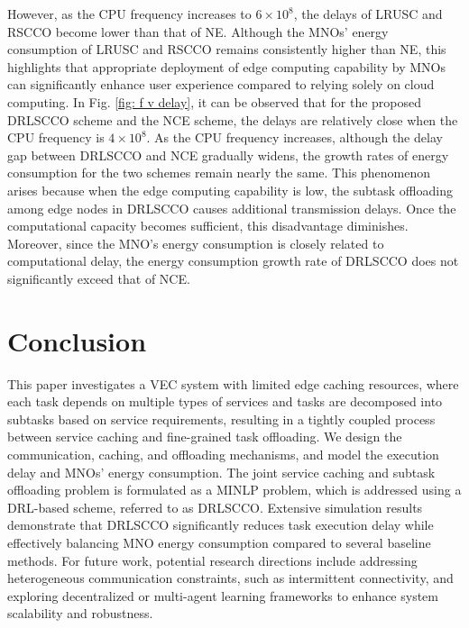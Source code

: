 \documentclass[lettersize,journal]{IEEEtran}
\begin{document}
However, as the CPU frequency increases to $6 \times 10^8$, the delays of LRUSC and RSCCO become lower than that of NE. Although the MNOs' energy consumption of LRUSC and RSCCO remains consistently higher than NE, this highlights that appropriate deployment of edge  computing capability by MNOs can significantly enhance user experience compared to relying solely on cloud computing.
In Fig. \ref{fig: f v delay}, it can be observed that for the proposed DRLSCCO scheme and the NCE scheme, the delays are relatively close when the CPU frequency is $4 \times 10^8$. As the CPU frequency increases, although the delay gap between DRLSCCO and NCE gradually widens, the growth rates of energy consumption for the two schemes remain nearly the same.
This phenomenon arises because when the edge computing capability is low, the subtask offloading among edge nodes in DRLSCCO causes additional transmission delays. Once the computational capacity becomes sufficient, this disadvantage diminishes. Moreover, since the MNO's energy consumption is closely related to computational delay, the energy consumption growth rate of DRLSCCO does not significantly exceed that of NCE.



\section{Conclusion}
This paper investigates a VEC system with limited edge caching resources, where each task depends on multiple types of services and tasks are decomposed into subtasks based on service requirements, resulting in a tightly coupled process between service caching and fine-grained task offloading.
We design the communication, caching, and offloading mechanisms, and model the execution delay and MNOs' energy consumption.
The joint service caching and subtask offloading problem is formulated as a MINLP problem, which is addressed using a DRL-based scheme, referred to as DRLSCCO.
Extensive simulation results demonstrate that DRLSCCO significantly reduces task execution delay while effectively balancing MNO energy consumption compared to several baseline methods.
For future work, potential research directions include addressing heterogeneous communication constraints, such as intermittent connectivity, and exploring decentralized or multi-agent learning frameworks to enhance system scalability and robustness.



\end{document}
